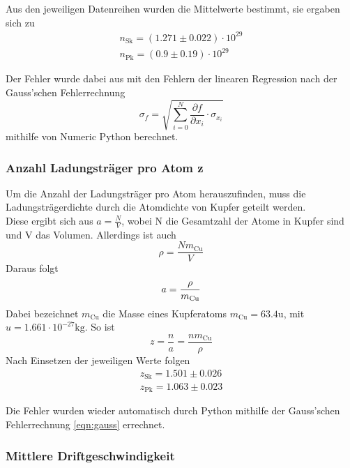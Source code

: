 \noindent Aus den jeweiligen Datenreihen wurden die Mittelwerte bestimmt, sie ergaben sich zu
\begin{align*}
n_\text{Sk} = \left( 1.271 \pm 0.022 \right) \cdot 10^{29}\\
n_\text{Pk} = \left( 0.9\pm 0.19 \right) \cdot 10^{29}
\end{align*}

Der Fehler wurde dabei aus mit den Fehlern der linearen Regression nach der Gauss'schen Fehlerrechnung
\begin{equation}
\sigma_f = \sqrt{\sum_{i=0}^{N} {\frac{\partial f}{\partial x_i} \cdot \sigma_{x_i}}}
\label{eqn:gauss}
\end{equation}
mithilfe von Numeric Python berechnet.

\subsubsection{Anzahl Ladungsträger pro Atom z}

Um die Anzahl der Ladungsträger pro Atom herauszufinden, muss die Ladungsträgerdichte durch 
die Atomdichte von Kupfer geteilt werden.\\
Diese ergibt sich aus $a = \frac{N}{V}$, wobei N die Gesamtzahl der Atome in Kupfer sind und V das Volumen. 
Allerdings ist auch 
\begin{equation}
\rho = \frac{N m_\text{Cu}}{V}
\end{equation}
Daraus folgt
\begin{equation}
a = \frac{\rho}{m_\text{Cu}} \\
\end{equation}
Dabei bezeichnet $m_\text{Cu}$ die Masse eines Kupferatoms $m_\text{Cu} = 63.4 \si{\atomicmassunit}$, mit $u = 1.661 \cdot 10^{-27}\si{\kilo\g}$.
So ist
\begin{equation}
z = \frac{n}{a} = \frac{n m_\text{Cu}}{\rho}
\end{equation}
Nach Einsetzen der jeweiligen Werte folgen
\begin{align*}
z_\text{Sk} = 1.501 \pm 0.026\\
z_\text{Pk} = 1.063 \pm 0.023
\end{align*}

Die Fehler wurden wieder automatisch durch Python mithilfe der Gauss'schen Fehlerrechnung 
\eqref{eqn:gauss} errechnet.

\subsubsection{Mittlere Driftgeschwindigkeit}

